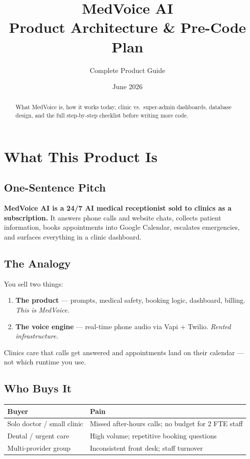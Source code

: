 \documentclass[11pt,a4paper]{article}
\title{MedVoice AI\\Product Architecture \& Pre-Code Plan}
\author{Complete Product Guide}
\date{June 2026}
\begin{document}
\maketitle

\begin{abstract}
What MedVoice is, how it works today, clinic vs.\ super-admin dashboards, database design, and the full step-by-step checklist before writing more code.
\end{abstract}

\tableofcontents
\newpage

\section{What This Product Is}

\subsection{One-Sentence Pitch}
\textbf{MedVoice AI is a 24/7 AI medical receptionist sold to clinics as a subscription.} It answers phone calls and website chats, collects patient information, books appointments into Google Calendar, escalates emergencies, and surfaces everything in a clinic dashboard.

\subsection{The Analogy}
You sell two things:
\begin{enumerate}[nosep]
  \item \textbf{The product} --- prompts, medical safety, booking logic, dashboard, billing. \emph{This is MedVoice.}
  \item \textbf{The voice engine} --- real-time phone audio via Vapi + Twilio. \emph{Rented infrastructure.}
\end{enumerate}
Clinics care that calls get answered and appointments land on their calendar --- not which runtime you use.

\subsection{Who Buys It}
\begin{center}
\small
\begin{tabular}{@{}ll@{}}
\toprule
\textbf{Buyer} & \textbf{Pain} \\
\midrule
Solo doctor / small clinic & Missed after-hours calls; no budget for 2 FTE staff \\
Dental / urgent care & High volume; repetitive booking questions \\
Multi-provider group & Inconsistent front desk; staff turnover \\
\bottomrule
\end{tabular}
\end{center}
\end{document}
